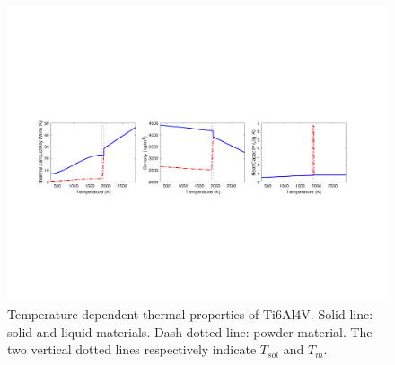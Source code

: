 \documentclass [11pt, proquest] {uwthesis}[2020/02/24]
\begin{document}
\begin{figure}[!ht]
\begin{centering}
\includegraphics[clip,width=16cm]{Closed-loop-simulation/temp_dependent_thermal_properties}
\par\end{centering}
\centering{}\caption{\label{fig:Temperature-dependent-physical-p}Temperature-dependent
thermal properties of Ti6Al4V.
Solid line: solid and liquid materials. Dash-dotted line: powder material.
The two vertical dotted lines respectively indicate $T_{sol}$ and
$T_{m}$.}
\end{figure}
\noindent 
\end{document}
